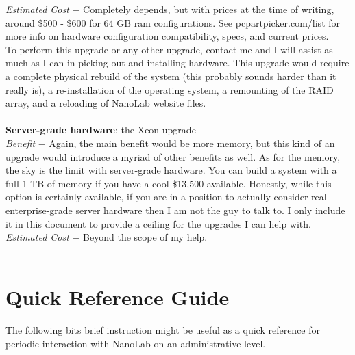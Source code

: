 \documentclass[titlepage]{article}
\begin{document}
    \noindent\textit{Estimated Cost} $-$ Completely depends, but with prices at the time of writing, around \$500 - \$600 for 64 GB ram configurations. See pcpartpicker.com/list for more info on hardware configuration compatibility, specs, and current prices.
    \\
    
    \noindent To perform this upgrade or any other upgrade, contact me and I will assist as much as I can in picking out and installing hardware. This upgrade would require a complete physical rebuild of the system (this probably sounds harder than it really is), a re-installation of the operating system, a remounting of the RAID array, and a reloading of NanoLab website files. 
    \\
    
    \noindent\makebox[\linewidth]{\rule{\textwidth}{0.4pt}}
    \\
    
    \noindent\textbf{Server-grade hardware}: the Xeon upgrade
    \\
    
    \noindent\textit{Benefit} $-$ Again, the main benefit would be more memory, but this kind of an upgrade would introduce a myriad of other benefits as well. As for the memory, the sky is the limit with server-grade hardware. You can build a system with a full 1 TB of memory if you have a cool \$13,500 available. Honestly, while this option is certainly available, if you are in a position to actually consider real enterprise-grade server hardware then I am not the guy to talk to. I only include it in this document to provide a ceiling for the upgrades I can help with.
    \\
    
    \noindent\textit{Estimated Cost} $-$ Beyond the scope of my help.
    \\
    
    \noindent\makebox[\linewidth]{\rule{\textwidth}{0.4pt}}
    \\
    
\section{Quick Reference Guide}

    The following bits brief instruction might be useful as a quick reference for periodic interaction with NanoLab on an administrative level.
    \\
    
    \noindent\makebox[\linewidth]{\rule{\textwidth}{0.4pt}}
    \\
    
\end{document}
